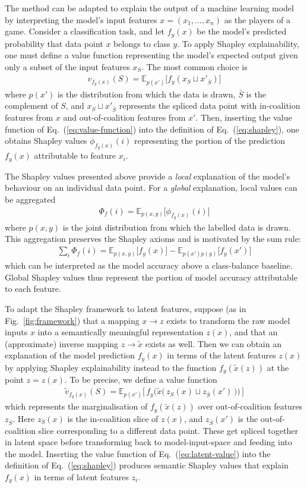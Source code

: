 \documentclass{article}
\DeclareRobustCommand{\Fig}[1]{Fig.~\ref{fig:#1}}
\DeclareRobustCommand{\Eq}[1]{Eq.~(\ref{eq:#1})}
\newcommand{\eqn}[1]{\begin{align}#1\end{align}}
\begin{document}
The method can be adapted to explain the output of a machine learning model by interpreting the model's input features $x = (x_1, \ldots, x_n)$ as the players of a game. Consider a classification task, and let $f_y(x)$ be the model's predicted probability that data point $x$ belongs to class $y$. To apply Shapley explainability, one must define a value function representing the model's expected output given only a subset of the input features $x_S$. The most common choice is
\eqn{
\label{eq:value-function}
v_{f_y(x)}(S) = \mathbb E_{p(x')} \big[ f_y(x_S \sqcup x'_{\bar S}) \big]
}
where $p(x')$ is the distribution from which the data is drawn, $\bar S$ is the complement of $S$, and $x_S \sqcup x'_{\bar S}$ represents the spliced data point with in-coalition features from $x$ and out-of-coalition features from $x'$. Then, inserting the value function of \Eq{value-function} into the definition of \Eq{shapley}, one obtains Shapley values $\phi_{f_y(x)}(i)$ representing the portion of the prediction $f_y(x)$ attributable to feature $x_i$.

The Shapley values presented above provide a \emph{local} explanation of the model's behaviour on an individual data point. For a \emph{global} explanation, local values can be aggregated \citep{frye2020shapley}
\eqn{
\label{eq:global-shapley}
\Phi_f(i) = \mathbb E_{p(x, y)} \big[ \phi_{f_y(x)}(i) \big]
}
where $p(x, y)$ is the joint distribution from which the labelled data is drawn. This aggregation preserves the Shapley axioms and is motivated by the sum rule:
\eqn{
\sum_i \Phi_f(i) = \mathbb E_{p(x, y)} \big[f_y(x)\big] - \mathbb E_{p(x')p(y)} \big[f_y(x')\big]
}
which can be interpreted as the model accuracy above a class-balance baseline. Global Shapley values thus represent the portion of model accuracy attributable to each feature. 

To adapt the Shapley framework to latent features, suppose (as in \Fig{framework}) that a mapping $x \to z$ exists to transform the raw model inputs $x$ into a semantically meaningful representation $z(x)$, and that an (approximate) inverse mapping $z \to \tilde x$ exists as well. Then we can obtain an explanation of the model prediction $f_y(x)$ in terms of the latent features $z(x)$ by applying Shapley explainability instead to the function $f_y(\tilde x(z))$ at the point $z = z(x)$. To be precise, we define a value function
\eqn{
\label{eq:latent-value}
\tilde v_{f_y(x)}(S) = \mathbb E_{p(x')} \Bigg[\, 
    f_y \Big( 
        \tilde x \big(\,
            z_S(x) \sqcup z_{\bar S}(x')
        \,\big)
    \Big) 
\,\Bigg]
}
which represents the marginalisation of $f_y(\tilde x(z))$ over out-of-coalition features $z_{\bar S}$.
Here $z_S(x)$ is the in-coalition slice of $z(x)$, and $z_{\bar S}(x')$ is the out-of-coalition slice corresponding to a different data point. These get spliced together in latent space before transforming back to model-input-space and feeding into the model. Inserting the value function of \Eq{latent-value} into the definition of \Eq{shapley} produces semantic Shapley values that explain $f_y(x)$ in terms of latent features $z_i$.
\end{document}
